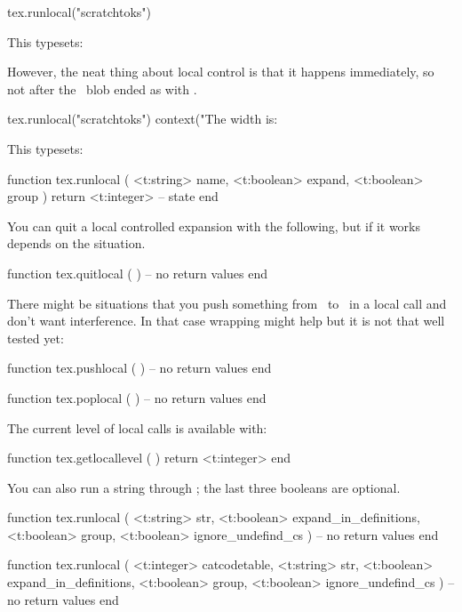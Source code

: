 \startbuffer
{}%
\startluacode
    tex.runlocal("scratchtoks")
\stopluacode
\stopbuffer

\typebuffer

This typesets: \inlinebuffer

However, the neat thing about local control is that it happens immediately, so not
after the \LUA\ blob ended as with .

\startbuffer
{}%
\startluacode
    tex.runlocal("scratchtoks")
    context("The width is: %
\stopluacode
\stopbuffer

\typebuffer

This typesets: \inlinebuffer

\starttyping[option=LUA]
function tex.runlocal (
    <t:string>  name,
    <t:boolean> expand,
    <t:boolean> group
)
    return <t:integer> -- state
end
\stoptyping

You can quit a local controlled expansion with the following, but if it works
depends on the situation.

\starttyping[option=LUA]
function tex.quitlocal ( )
    -- no return values
end
\stoptyping

There might be situations that you push something from \LUA\ to \TEX\ in a local
call and don't want interference. In that case wrapping might help but it is not
that well tested yet:

\starttyping[option=LUA]
function tex.pushlocal ( )
    -- no return values
end

function tex.poplocal  ( )
    -- no return values
end
\stoptyping

The current level of local calls is available with:

\starttyping[option=LUA]
function tex.getlocallevel ( )
    return <t:integer>
end
\stoptyping

You can also run a string through \TEX; the last three booleans are optional.

\starttyping[option=LUA]
function tex.runlocal (
    <t:string>  str,
    <t:boolean> expand_in_definitions,
    <t:boolean> group,
    <t:boolean> ignore_undefind_cs
)
    -- no return values
end

function tex.runlocal (
    <t:integer> catcodetable,
    <t:string>  str,
    <t:boolean> expand_in_definitions,
    <t:boolean> group,
    <t:boolean> ignore_undefind_cs
)
    -- no return values
end
\stoptyping

